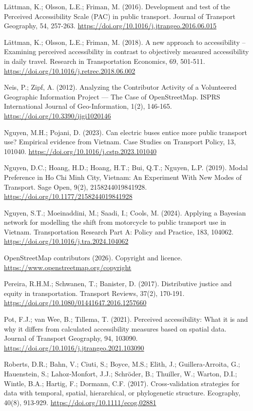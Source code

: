 \documentclass[
  11pt,
  a4paper,
]{article}
\begin{document}
Lättman, K.; Olsson, L.E.; Friman, M. (2016). Development and test of
the Perceived Accessibility Scale (PAC) in public transport. Journal of
Transport Geography, 54, 257-263.
\url{https://doi.org/10.1016/j.jtrangeo.2016.06.015}

Lättman, K.; Olsson, L.E.; Friman, M. (2018). A new approach to
accessibility -- Examining perceived accessibility in contrast to
objectively measured accessibility in daily travel. Research in
Transportation Economics, 69, 501-511.
\url{https://doi.org/10.1016/j.retrec.2018.06.002}

Neis, P.; Zipf, A. (2012). Analyzing the Contributor Activity of a
Volunteered Geographic Information Project --- The Case of
OpenStreetMap. ISPRS International Journal of Geo-Information, 1(2),
146-165. \url{https://doi.org/10.3390/ijgi1020146}

Nguyen, M.H.; Pojani, D. (2023). Can electric buses entice more public
transport use? Empirical evidence from Vietnam. Case Studies on
Transport Policy, 13, 101040.
\url{https://doi.org/10.1016/j.cstp.2023.101040}

Nguyen, D.C.; Hoang, H.D.; Hoang, H.T.; Bui, Q.T.; Nguyen, L.P. (2019).
Modal Preference in Ho Chi Minh City, Vietnam: An Experiment With New
Modes of Transport. Sage Open, 9(2), 2158244019841928.
\url{https://doi.org/10.1177/2158244019841928}

Nguyen, S.T.; Moeinaddini, M.; Saadi, I.; Cools, M. (2024). Applying a
Bayesian network for modelling the shift from motorcycle to public
transport use in Vietnam. Transportation Research Part A: Policy and
Practice, 183, 104062. \url{https://doi.org/10.1016/j.tra.2024.104062}

OpenStreetMap contributors (2026). Copyright and licence.
\url{https://www.openstreetmap.org/copyright}

Pereira, R.H.M.; Schwanen, T.; Banister, D. (2017). Distributive justice
and equity in transportation. Transport Reviews, 37(2), 170-191.
\url{https://doi.org/10.1080/01441647.2016.1257660}

Pot, F.J.; van Wee, B.; Tillema, T. (2021). Perceived accessibility:
What it is and why it differs from calculated accessibility measures
based on spatial data. Journal of Transport Geography, 94, 103090.
\url{https://doi.org/10.1016/j.jtrangeo.2021.103090}

Roberts, D.R.; Bahn, V.; Ciuti, S.; Boyce, M.S.; Elith, J.;
Guillera‐Arroita, G.; Hauenstein, S.; Lahoz‐Monfort, J.J.; Schröder, B.;
Thuiller, W.; Warton, D.I.; Wintle, B.A.; Hartig, F.; Dormann, C.F.
(2017). Cross‐validation strategies for data with temporal, spatial,
hierarchical, or phylogenetic structure. Ecography, 40(8), 913-929.
\url{https://doi.org/10.1111/ecog.02881}
\end{document}
